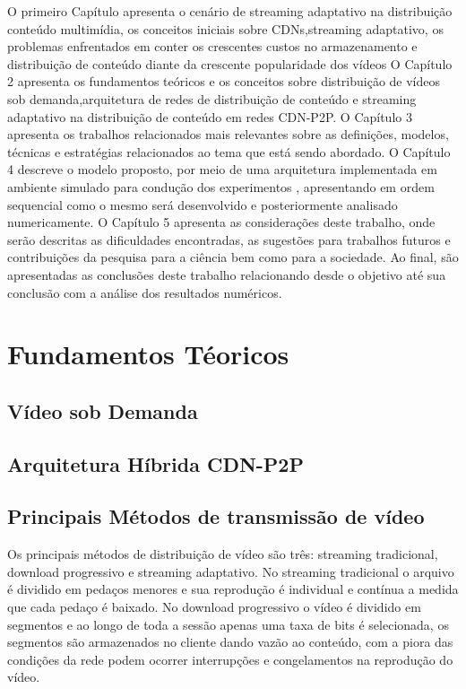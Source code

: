 \documentclass[
	12pt,
	oneside,
	a4paper,
	english,
	brazil
	]{abntex2ppgsi}
\begin{document}
O primeiro Capítulo apresenta o cenário de streaming adaptativo na distribuição conteúdo multimídia, os conceitos iniciais sobre CDNs,streaming adaptativo, os problemas enfrentados em conter os crescentes custos no armazenamento e distribuição de conteúdo diante da crescente popularidade dos vídeos
O Capítulo 2 apresenta os fundamentos teóricos e os conceitos sobre distribuição de vídeos sob demanda,arquitetura de redes de distribuição de conteúdo e streaming adaptativo na distribuição de conteúdo em redes CDN-P2P.
O Capítulo 3 apresenta os trabalhos relacionados mais relevantes sobre as definições, modelos, técnicas e estratégias relacionados ao tema que está sendo abordado. 
O Capítulo 4 descreve o modelo proposto, por meio de uma arquitetura implementada em ambiente simulado para condução dos experimentos , apresentando em ordem sequencial como o mesmo será desenvolvido e posteriormente analisado numericamente.
O Capítulo 5 apresenta as considerações deste trabalho, onde serão descritas as dificuldades encontradas, as sugestões para trabalhos futuros e contribuições da pesquisa para a ciência bem como para a sociedade. Ao final, são apresentadas as conclusões deste trabalho relacionando desde o objetivo até sua conclusão com a análise dos resultados numéricos.



\chapter{Fundamentos Téoricos}

\section{Vídeo sob Demanda}

 

\section{Arquitetura Híbrida CDN-P2P}






\section{Principais Métodos de transmissão de vídeo}

Os principais métodos de distribuição de vídeo são três: streaming tradicional, download progressivo e streaming adaptativo. No streaming tradicional o arquivo  é dividido em pedaços menores e sua reprodução é individual e contínua a medida que cada pedaço é baixado. No download progressivo o vídeo é dividido em segmentos e ao longo de toda a  sessão  apenas uma taxa de bits é selecionada, os segmentos são armazenados no cliente dando vazão ao conteúdo, com a piora das condições da rede podem ocorrer interrupções e congelamentos na reprodução do vídeo.
\end{document}

